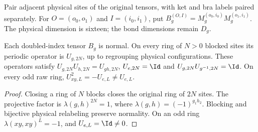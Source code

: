 \begin{definition}
    \label{def:asymex_z2z2_blocked}
    \leanok
    Pair adjacent physical sites of the original tensors, with ket and bra
    labels paired separately. For $O=(o_0,o_1)$ and $I=(i_0,i_1)$, put
    $B_g^{(O,I)}=M_g^{(o_0,i_0)}M_g^{(o_1,i_1)}$. The physical dimension
    is sixteen; the bond dimensions remain $D_g$.
\end{definition}

\begin{lemma}
    \label{lem:asymex_z2z2_blocked_exact}
    \leanok
    Each doubled-index tensor $B_g$ is normal. On every ring of $N>0$
    blocked sites its periodic operator is $U_{g,2N}$, up to regrouping
    physical configurations. These operators satisfy
    $U_{g,2N}U_{h,2N}=U_{gh,2N}$, $U_{e,2N}=\Id$ and
    $U_{g,2N}U_{g^{-1},2N}=\Id$. On every odd raw ring,
    $U_{xy,L}^2=-U_{e,L}\neq U_{e,L}$.
\end{lemma}

\begin{proof}
    \leanok
    Closing a ring of $N$ blocks closes the original ring of $2N$ sites.
    The projective factor is $\lambda(g,h)^{2N}=1$, where
    $\lambda(g,h)=(-1)^{g_1h_2}$. Blocking and bijective physical
    relabeling preserve normality. On an odd ring
    $\lambda(xy,xy)^L=-1$, and $U_{e,L}=\Id\neq0$.
\end{proof}

